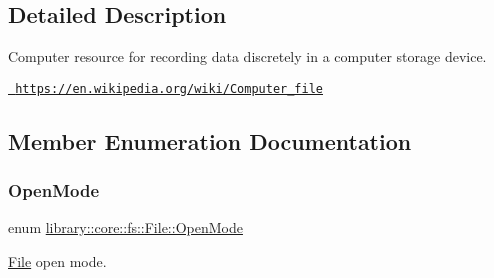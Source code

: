 \subsection{Detailed Description}
Computer resource for recording data discretely in a computer storage device. 

\href{https://en.wikipedia.org/wiki/Computer_file}{\texttt{ https\+://en.\+wikipedia.\+org/wiki/\+Computer\+\_\+file}} 

\subsection{Member Enumeration Documentation}
\mbox{\label{classlibrary_1_1core_1_1fs_1_1_file_ac18b7d7ee50c803cbd0087b0f71ce4f7}} 
\subsubsection{\texorpdfstring{OpenMode}{OpenMode}}
{\footnotesize\ttfamily enum \mbox{\hyperlink{classlibrary_1_1core_1_1fs_1_1_file_ac18b7d7ee50c803cbd0087b0f71ce4f7}{library\+::core\+::fs\+::\+File\+::\+Open\+Mode}}\hspace{0.3cm}{\ttfamily [strong]}}



\mbox{\hyperlink{classlibrary_1_1core_1_1fs_1_1_file}{File}} open mode. 

